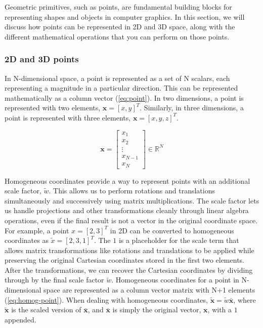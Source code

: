 Geometric primitives, such as points, are fundamental building blocks for representing shapes and objects in computer graphics. In this section, we will discuss how points can be represented in 2D and 3D space, along with the different mathematical operations that you can perform on those points.

\subsubsection{2D and 3D points}
\label{sec:geometric-points}
In N-dimensional space, a point is represented as a set of N scalars, each representing a magnitude in a particular direction. This can be represented mathematically as a column vector (\cref{eq:point}). In two dimensions, a point is represented with two elements, $\mathbf{x} = [x , y]^{T}$. Similarly, in three dimensions, a point is represented with three elements, $\mathbf{x} = [x , y , z]^{T}$.

\begin{equation}
    \mathbf{x} = \begin{bmatrix}
        x_1 \\ x_2 \\ \vdots \\ x_{N-1} \\ x_N
    \end{bmatrix} \in \mathbb{R}^N
    \label{eq:point}
\end{equation}


Homogeneous coordinates provide a way to represent points with an additional scale factor, $\tilde{w}$.
This allows us to perform rotations and translations simultaneously and successively using matrix multiplications.
The scale factor lets us handle projections and other transformations cleanly through linear algebra operations, even if the final result is not a vector in the original coordinate space.
For example, a point $x = [2,3]^{T}$ in 2D can be converted to homogeneous coordinates as $\tilde{x} = [2,3,1]^{T}$.
The $1$ is a placeholder for the scale term that allows matrix transformations like rotations and translations to be applied while preserving the original Cartesian coordinates stored in the first two elements.
After the transformations, we can recover the Cartesian coordinates by dividing through by the final scale factor $\tilde{w}$.
Homogeneous coordinates for a point in N-dimensional space are represented as a column vector matrix with N+1 elements (\cref{eq:homog-point}).
When dealing with homogeneous coordinates, $\mathbf{\tilde{x}} = \tilde{w}\mathbf{\bar{x}}$, where $\mathbf{\tilde{x}}$ is the scaled version of $\bar{\mathbf{x}}$, and $\bar{\mathbf{x}}$ is simply the original vector, $\mathbf{x}$, with a $1$ appended.

